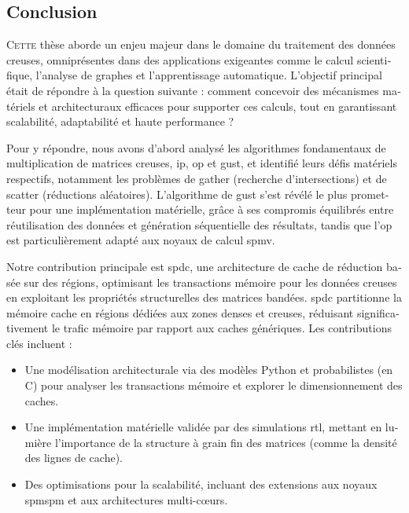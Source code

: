 \begin{otherlanguage}{french}

\addtocounter{synthFCnt}{1}
\section{Conclusion}

\lettrine{C}{ette} thèse aborde un enjeu majeur dans le domaine du traitement des données creuses, omniprésentes dans des applications exigeantes comme le calcul scientifique, l'analyse de graphes et l'apprentissage automatique.
L'objectif principal était de répondre à la question suivante : comment concevoir des mécanismes matériels et architecturaux efficaces pour supporter ces calculs, tout en garantissant scalabilité, adaptabilité et haute performance ?

Pour y répondre, nous avons d'abord analysé les algorithmes fondamentaux de multiplication de matrices creuses, \acrfull{ip}, \acrfull{op} et \acrfull{gust}, et identifié leurs défis matériels respectifs, notamment les problèmes de \gls{gather} (recherche d'intersections) et de \gls{scatter} (réductions aléatoires).
L'algorithme de \acrlong{gust} s'est révélé le plus prometteur pour une implémentation matérielle, grâce à ses compromis équilibrés entre réutilisation des données et génération séquentielle des résultats, tandis que l'\acrshort{op} est particulièrement adapté aux noyaux de calcul \acrshort{spmv}.

Notre contribution principale est \acrlong{spdc}, une architecture de cache de réduction basée sur des régions, optimisant les transactions mémoire pour les données creuses en exploitant les propriétés structurelles des matrices bandées.
\acrlong{spdc} partitionne la mémoire cache en régions dédiées aux zones denses et creuses, réduisant significativement le trafic mémoire par rapport aux caches génériques.
Les contributions clés incluent :
\begin{itemize}
    \item Une modélisation architecturale via des modèles Python et probabilistes (en C) pour analyser les transactions mémoire et explorer le dimensionnement des caches.
    \item Une implémentation matérielle validée par des simulations \acrshort{rtl}, mettant en lumière l'importance de la structure à grain fin des matrices (comme la densité des lignes de cache).
    \item Des optimisations pour la scalabilité, incluant des extensions aux noyaux \acrshort{spmspm} et aux architectures multi-c\oe{}urs.
\end{itemize}


\end{otherlanguage}

